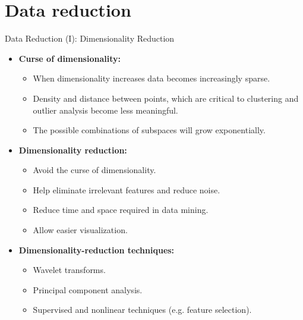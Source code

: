 \section{Data reduction}

\begin{frame}{Data Reduction (I): Dimensionality Reduction}
	\begin{itemize}
		\item \textbf{Curse of dimensionality:}
		\begin{itemize}
			\item When dimensionality increases data becomes increasingly 
			sparse.
			\item Density and distance between points, which are critical to 
			clustering and outlier analysis become less meaningful.
			\item The possible combinations of subspaces will grow 
			exponentially.
		\end{itemize}
		\item \textbf{Dimensionality reduction:}
		\begin{itemize}
			\item Avoid the curse of dimensionality.
			\item Help eliminate irrelevant features and reduce noise.
			\item Reduce time and space required in data mining.
			\item Allow easier visualization.
		\end{itemize}
		\item \textbf{Dimensionality-reduction techniques:}
		\begin{itemize}
			\item Wavelet transforms.
			\item Principal component analysis.
			\item Supervised and nonlinear techniques (e.g. feature selection).
		\end{itemize}
	\end{itemize}
\end{frame}

